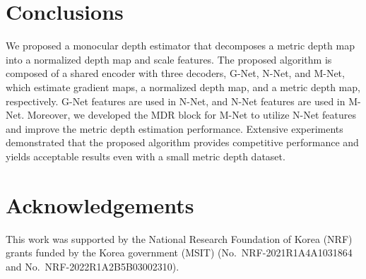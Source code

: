 \documentclass[runningheads]{llncs}
\begin{document}
\section{Conclusions}
\label{sec:conclusions}

We proposed a monocular depth estimator that decomposes a metric depth map into a normalized depth map and scale features. The proposed algorithm is composed of a shared encoder with three decoders, G-Net, N-Net, and M-Net, which estimate gradient maps, a normalized depth map, and a metric depth map, respectively. G-Net features are used in N-Net, and N-Net features are used in M-Net. Moreover, we developed the MDR block for M-Net to utilize N-Net features and improve the metric depth estimation performance. Extensive experiments demonstrated that the proposed algorithm provides competitive performance and yields acceptable results even with a small metric depth dataset.

\section*{Acknowledgements}
This work was supported by the National Research Foundation of Korea (NRF) grants funded by the Korea government (MSIT) (No.~NRF-2021R1A4A1031864 and No.~NRF-2022R1A2B5B03002310).


\end{document}
